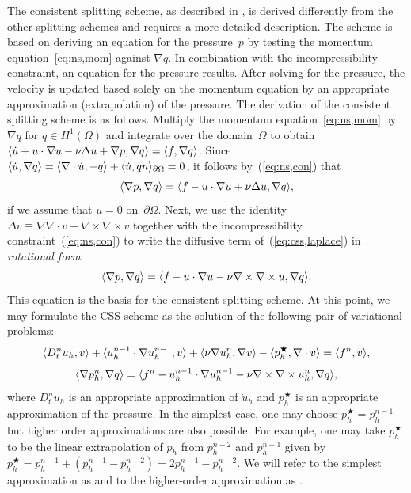 The consistent splitting scheme, as described
in \citet{GuermondMinevShen2006,GuermondShen2003}, is derived
differently from the other splitting schemes and requires a more
detailed description. The scheme is based on deriving an equation for
the pressure~$p$ by testing the momentum equation~\eqref{eq:ns,mom}
against $\nabla q$.  In combination with the incompressibility
constraint, an equation for the pressure results. After solving for
the pressure, the velocity is updated based solely on the momentum
equation by an appropriate approximation (extrapolation) of the
pressure. The derivation of the consistent splitting scheme is as
follows. Multiply the momentum equation~\eqref{eq:ns,mom} by $\nabla
q$ for $q
\in H^1(\Omega)$ and integrate over the domain~$\Omega$ to obtain
$\renni{\nabla q}{\dot{u} + u \cdot \nabla u - \nu \Delta u + \nabla
  p} = \renni{\nabla q}{f}$. Since $\renni{\nabla q}{\dot{u}} =
\renni{-q}{\nabla \cdot \dot{u}} + \renni{qn}{\dot{u}}_{\partial
  \Omega} = 0$, it follows by~(\ref{eq:ns,con}) that
\begin{equation}\label{eq:css,laplace}
  \renni{\nabla q}{\nabla p} = \renni{\nabla q}{f - u \cdot \nabla u +
    \nu \Delta u},
\end{equation}
if we assume that $\dot{u} = 0$ on~$\partial\Omega$. Next, we use the
identity $\Delta v \equiv \nabla \nabla \cdot v - \nabla \times \nabla
\times v$ together with the incompressibility
constraint~(\ref{eq:ns,con}) to write the diffusive term
of~(\ref{eq:css,laplace}) in
\emph{rotational form}:
\begin{equation}\label{eq:css,curl}
  \renni{\nabla q}{\nabla p} = \renni{\nabla q}{f - u \cdot \nabla u -
    \nu \nabla \times \nabla \times u}.
\end{equation}
This equation is the basis for the consistent splitting scheme. At
this point, we may formulate the CSS scheme as the solution of the
following pair of variational problems:
\begin{equation} \label{eq:css,u}
  \inner{D_t^n u_h}{v}
  + \inner{u_h^{n-1} \cdot \nabla u_h^{n-1}}{v}
  + \inner{\nu \nabla u_h^n}{\nabla v}
  - \inner{p_h^{\bigstar}}{\nabla \cdot v}
  = \inner{f^n}{v},
\end{equation}
\begin{equation} \label{eq:css,pn}
  \renni{\nabla q}{\nabla p_h^n} =
  \renni{\nabla q}{f^n - u_h^{n-1} \cdot \nabla u_h^{n-1} - \nu \nabla \times \nabla \times u_h^n},
\end{equation}
where $D_t^n u_h$ is an appropriate approximation of $\dot{u}_h$ and
$p^{\bigstar}_h$ is an appropriate approximation of the pressure. In
the simplest case, one may choose $p_h^{\bigstar} = p_h^{n-1}$ but
higher order approximations are also possible. For example, one may
take $p_h^{\bigstar}$ to be the linear extrapolation of $p_h$ from
$p_h^{n-2}$ and $p_h^{n-1}$ given by $p_h^{\bigstar} = p_h^{n-1} +
(p_h^{n-1} - p_h^{n-2}) = 2p_h^{n-1} - p_h^{n-2}$. We will refer to
the simplest approximation as  and to the higher-order
approximation as .

